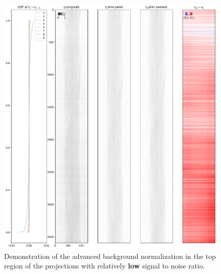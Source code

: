 \documentclass[12pt]{scrartcl}
\newcommand{\myscale}{1}
\begin{document}
\renewcommand{\myscale}{0.5}
\begin{figure}
\centering
\includegraphics[scale=\myscale]{sinogramNormalization_top}
\caption{
Demonstration of the advanced background normalization in the top region of the projections with relatively \textbf{low} signal to noise ratio.
}\label{fig: sino norm top}
\end{figure}
\end{document}
